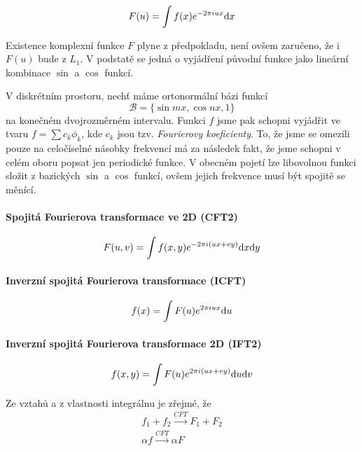 \begin{equation}
F(u)=\int f(x)e^{-2\pi i u x}{\rm d} x
\end{equation}

Existence komplexní funkce $F$ plyne z předpokladu, není ovšem zaručeno, že i $F(u)$ bude z $L_1$. 
V podstatě se jedná o vyjádření původní
funkce jako lineární kombinace $\sin$ a $\cos$ funkcí.

V diskrétním prostoru, nechť máme ortonormální bázi funkcí 
\begin{equation}
\mathcal{B}=\{\sin mx,\cos nx,1\}
\end{equation}
na konečném
dvojrozměrném intervalu. Funkci $f$ jsme pak schopni
vyjádřit ve tvaru $f=\sum c_k \phi_k$, kde $c_k$ jsou tzv. {\em Fourierovy koeficienty}. To, že jsme se omezili pouze na
celočíselné násobky frekvencí má za následek fakt, že jsme schopni v celém oboru popsat jen periodické funkce. V obecném
 pojetí lze libovolnou funkci složit z bazických $\sin$ a $\cos$ funkcí, ovšem jejich frekvence musí být spojitě se měnící.
 
\paragraph{Spojitá Fourierova transformace ve 2D (CFT2)}
\begin{equation}
F(u,v)=\int f(x,y)e^{-2\pi i (ux+vy)}{\rm d} x{\rm d} y
\end{equation}

\paragraph{Inverzní spojitá Fourierova transformace (ICFT)}
\begin{equation}
f(x)=\int F(u)e^{2\pi i u x}{\rm d} u
\end{equation}

\paragraph{Inverzní spojitá Fourierova transformace 2D (IFT2)}
\begin{equation}
f(x,y)=\int F(u)e^{2\pi i (u x+vy)}{\rm d} u{\rm d} v
\end{equation}
 
Ze vztahů a z vlastnosti integrálnu je zřejmé, že 
\begin{eqnarray}
f_1+f_2\stackrel{CFT}{\rightarrow} F_1+F_2\\
\alpha f \stackrel{CFT}{\rightarrow} \alpha F
\end{eqnarray}

